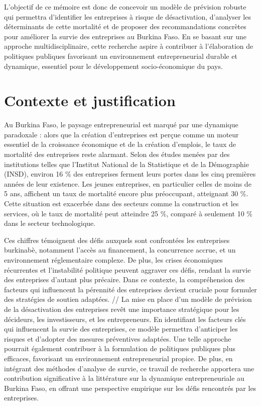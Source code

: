 \documentclass[a4paper,12pt]{report}
\begin{document}
L'objectif de ce mémoire est donc de concevoir un modèle de prévision robuste qui permettra d'identifier les entreprises à risque de désactivation, d'analyser les déterminants de cette mortalité et de proposer des recommandations concrètes pour améliorer la survie des entreprises au Burkina Faso. En se basant sur une approche multidisciplinaire, cette recherche aspire à contribuer à l'élaboration de politiques publiques favorisant un environnement entrepreneurial durable et dynamique, essentiel pour le développement socio-économique du pays.
\section{Contexte et justification}
Au Burkina Faso, le paysage entrepreneurial est marqué par une dynamique paradoxale : alors que la création d'entreprises est perçue comme un moteur essentiel de la croissance économique et de la création d'emplois, le taux de mortalité des entreprises reste alarmant. Selon des études menées par des institutions telles que l'Institut National de la Statistique et de la Démographie (INSD), environ 16 \% des entreprises ferment leurs portes dans les cinq premières années de leur existence. Les jeunes entreprises, en particulier celles de moins de 5 ans, affichent un taux de mortalité encore plus préoccupant, atteignant 30 \%. Cette situation est exacerbée dans des secteurs comme la construction et les services, où le taux de mortalité peut atteindre 25 \%, comparé à seulement 10 \% dans le secteur technologique.

Ces chiffres témoignent des défis auxquels sont confrontées les entreprises burkinabè, notamment l’accès au financement, la concurrence accrue, et un environnement réglementaire complexe. De plus, les crises économiques récurrentes et l’instabilité politique peuvent aggraver ces défis, rendant la survie des entreprises d'autant plus précaire. Dans ce contexte, la compréhension des facteurs qui influencent la pérennité des entreprises devient cruciale pour formuler des stratégies de soutien adaptées.
//
La mise en place d'un modèle de prévision de la désactivation des entreprises revêt une importance stratégique pour les décideurs, les investisseurs, et les entrepreneurs. En identifiant les facteurs clés qui influencent la survie des entreprises, ce modèle permettra d'anticiper les risques et d'adopter des mesures préventives adaptées. Une telle approche pourrait également contribuer à la formulation de politiques publiques plus efficaces, favorisant un environnement entrepreneurial propice. De plus, en intégrant des méthodes d'analyse de survie, ce travail de recherche apportera une contribution significative à la littérature sur la dynamique entrepreneuriale au Burkina Faso, en offrant une perspective empirique sur les défis rencontrés par les entreprises.
\end{document}
